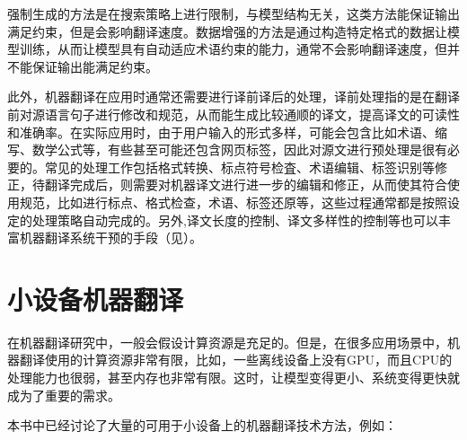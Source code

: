 \parinterval 强制生成的方法是在搜索策略上进行限制，与模型结构无关，这类方法能保证输出满足约束，但是会影响翻译速度。数据增强的方法是通过构造特定格式的数据让模型训练，从而让模型具有自动适应术语约束的能力，通常不会影响翻译速度，但并不能保证输出能满足约束。

\parinterval 此外，机器翻译在应用时通常还需要进行译前译后的处理，译前处理指的是在翻译前对源语言句子进行修改和规范，从而能生成比较通顺的译文，提高译文的可读性和准确率。在实际应用时，由于用户输入的形式多样，可能会包含比如术语、缩写、数学公式等，有些甚至可能还包含网页标签，因此对源文进行预处理是很有必要的。常见的处理工作包括格式转换、标点符号检査、术语编辑、标签识别等修正，待翻译完成后，则需要对机器译文进行进一步的编辑和修正，从而使其符合使用规范，比如进行标点、格式检查，术语、标签还原等，这些过程通常都是按照设定的处理策略自动完成的。另外,译文长度的控制、译文多样性的控制等也可以丰富机器翻译系统干预的手段（见{\chapterfourteen}）。

\sectionnewpage
\section{小设备机器翻译}

\parinterval 在机器翻译研究中，一般会假设计算资源是充足的。但是，在很多应用场景中，机器翻译使用的计算资源非常有限，比如，一些离线设备上没有GPU，而且CPU的处理能力也很弱，甚至内存也非常有限。这时，让模型变得更小、系统变得更快就成为了重要的需求。

\parinterval 本书中已经讨论了大量的可用于小设备上的机器翻译技术方法，例如：

